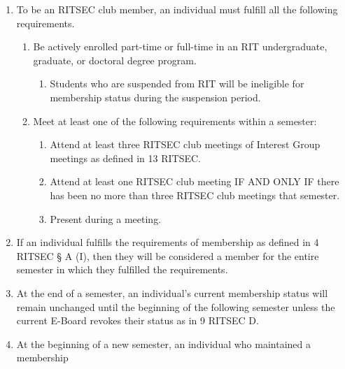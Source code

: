 


\begin{enumerate}
	\item To be an RITSEC club member, an individual must fulfill all the following
	      requirements.
	      \begin{enumerate}
		      \item Be actively enrolled part-time or full-time in an RIT undergraduate, graduate,
		            or doctoral degree program.
		            \begin{enumerate}
			            \item Students who are suspended from RIT will be ineligible for membership status
			                  during the suspension period.
		            \end{enumerate}
		      \item Meet at least one of the following requirements within a semester:
		            \begin{enumerate}
			            \item Attend at least three RITSEC club meetings of Interest Group meetings as defined in 13 RITSEC\@.
			            \item Attend at least one RITSEC club meeting IF AND ONLY IF there has been no more
			                  than three RITSEC club meetings that semester.
					\item Present during a meeting.
		            \end{enumerate}
	      \end{enumerate}
	\item If an individual fulfills the requirements of membership as defined in 4 RITSEC
	      § A (I), then they will be considered a member for the entire semester in which
	      they fulfilled the requirements.
	\item At the end of a semester, an individual's current membership status will remain
	      unchanged until the beginning of the following semester unless the current
	      E-Board revokes their status as in 9 RITSEC D.
	\item At the beginning of a new semester, an individual who maintained a membership

\end{enumerate}
